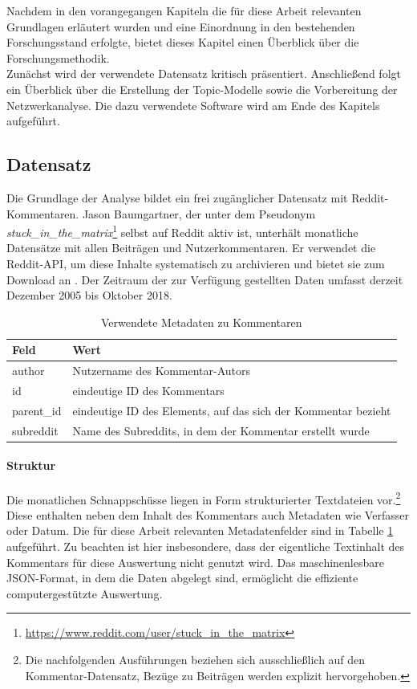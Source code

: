\documentclass[11pt,a4paper,twoside]{article}
\let\rmarkdownfootnote\footnote%
\def\footnote{\protect\rmarkdownfootnote}
\let\oldpar\paragraph
\renewcommand{\paragraph}{\oldpar*}
\begin{document}
Nachdem in den vorangegangen Kapiteln die für diese Arbeit relevanten
Grundlagen erläutert wurden und eine Einordnung in den bestehenden
Forschungsstand erfolgte, bietet dieses Kapitel einen Überblick über die
Forschungsmethodik.\\
Zunächst wird der verwendete Datensatz kritisch präsentiert.
Anschließend folgt ein Überblick über die Erstellung der Topic-Modelle
sowie die Vorbereitung der Netzwerkanalyse. Die dazu verwendete Software
wird am Ende des Kapitels aufgeführt.

\hypertarget{datensatz}{%
\subsection{Datensatz}\label{datensatz}}

Die Grundlage der Analyse bildet ein frei zugänglicher Datensatz mit
Reddit-Kommentaren. Jason Baumgartner, der unter dem Pseudonym
\emph{stuck\_in\_the\_matrix}\footnote{\url{https://www.reddit.com/user/stuck_in_the_matrix}}
selbst auf Reddit aktiv ist, unterhält monatliche Datensätze mit allen
Beiträgen und Nutzerkommentaren. Er verwendet die Reddit-API, um diese
Inhalte systematisch zu archivieren und bietet sie zum Download an
\autocite{Baumgartner}. Der Zeitraum der zur Verfügung gestellten Daten
umfasst derzeit Dezember 2005 bis Oktober 2018.

\begin{table}[!h]

\caption{\label{tab:importantkeys}Verwendete Metadaten zu Kommentaren}
\centering
\begin{tabular}[t]{ll}
\toprule
Feld & Wert\\
\midrule
author & Nutzername des Kommentar-Autors\\
id & eindeutige ID des Kommentars\\
parent\_id & eindeutige ID des Elements, auf das sich der Kommentar bezieht\\
subreddit & Name des Subreddits, in dem der Kommentar erstellt wurde\\
\bottomrule
\end{tabular}
\end{table}

\hypertarget{struktur}{%
\paragraph{Struktur}\label{struktur}}

Die monatlichen Schnappschüsse liegen in Form strukturierter Textdateien
vor.\footnote{Die nachfolgenden Ausführungen beziehen sich
  ausschließlich auf den Kommentar-Datensatz, Bezüge zu Beiträgen werden
  explizit hervorgehoben.} Diese enthalten neben dem Inhalt des
Kommentars auch Metadaten wie Verfasser oder Datum. Die für diese Arbeit
relevanten Metadatenfelder sind in Tabelle \ref{tab:importantkeys}
aufgeführt. Zu beachten ist hier insbesondere, dass der eigentliche
Textinhalt des Kommentars für diese Auswertung nicht genutzt wird. Das
maschinenlesbare JSON-Format, in dem die Daten abgelegt sind, ermöglicht
die effiziente computergestützte Auswertung.
\end{document}
